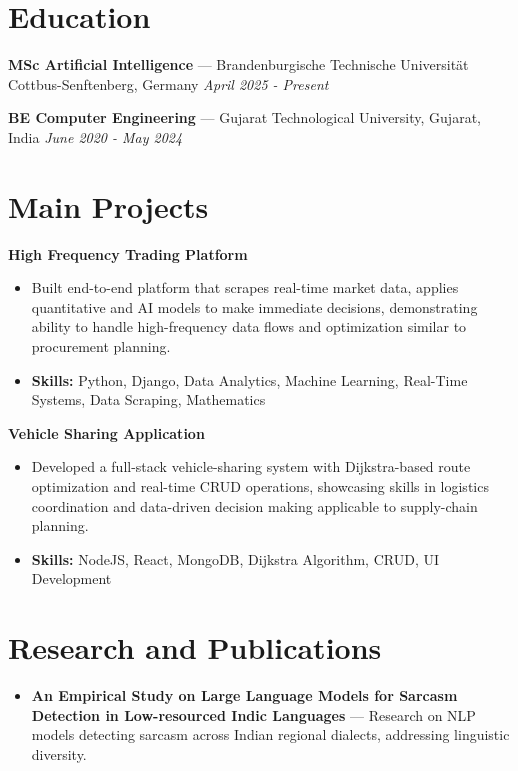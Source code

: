 \documentclass[a4paper,10pt]{article}
\begin{document}
\section*{Education}
\textbf{MSc Artificial Intelligence} — Brandenburgische Technische Universität Cottbus-Senftenberg, Germany \hfill \textit{April 2025 - Present}\par
\vspace{1.5pt}
\textbf{BE Computer Engineering} — Gujarat Technological University, Gujarat, India \hfill \textit{June 2020 - May 2024}\par

\section*{Main Projects}
\textbf{High Frequency Trading Platform}\par
\vspace{1pt}
\begin{itemize}
  \item Built end-to-end platform that scrapes real-time market data, applies quantitative and AI models to make immediate decisions, demonstrating ability to handle high-frequency data flows and optimization similar to procurement planning.
  \item \textbf{Skills:} Python, Django, Data Analytics, Machine Learning, Real-Time Systems, Data Scraping, Mathematics
\end{itemize}
\vspace{3pt}
\textbf{Vehicle Sharing Application}\par
\vspace{1pt}
\begin{itemize}
  \item Developed a full-stack vehicle-sharing system with Dijkstra-based route optimization and real-time CRUD operations, showcasing skills in logistics coordination and data-driven decision making applicable to supply-chain planning.
  \item \textbf{Skills:} NodeJS, React, MongoDB, Dijkstra Algorithm, CRUD, UI Development
\end{itemize}

\section*{Research and Publications}
\begin{itemize}
\item \textbf{An Empirical Study on Large Language Models for Sarcasm Detection in Low-resourced Indic Languages} — Research on NLP models detecting sarcasm across Indian regional dialects, addressing linguistic diversity.
\end{itemize}
\end{document}
